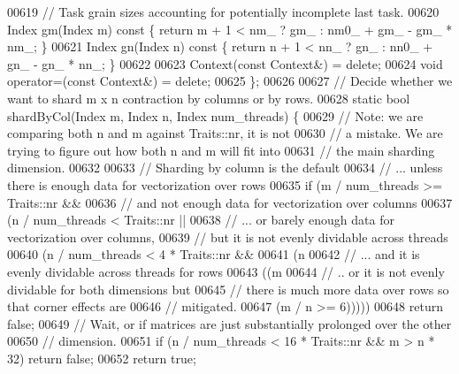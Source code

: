 \begin{DoxyCode}
00619     \textcolor{comment}{// Task grain sizes accounting for potentially incomplete last task.}
00620     Index gm(Index m)\textcolor{keyword}{ const }\{ \textcolor{keywordflow}{return} m + 1 < nm\_ ? gm\_ : nm0\_ + gm\_ - gm\_ * nm\_; \}
00621     Index gn(Index n)\textcolor{keyword}{ const }\{ \textcolor{keywordflow}{return} n + 1 < nn\_ ? gn\_ : nn0\_ + gn\_ - gn\_ * nn\_; \}
00622 
00623     Context(\textcolor{keyword}{const} Context&) = \textcolor{keyword}{delete};
00624     \textcolor{keywordtype}{void} operator=(\textcolor{keyword}{const} Context&) = \textcolor{keyword}{delete};
00625   \};
00626 
00627   \textcolor{comment}{// Decide whether we want to shard m x n contraction by columns or by rows.}
00628   \textcolor{keyword}{static} \textcolor{keywordtype}{bool} shardByCol(Index m, Index n, Index num\_threads) \{
00629     \textcolor{comment}{// Note: we are comparing both n and m against Traits::nr, it is not}
00630     \textcolor{comment}{// a mistake. We are trying to figure out how both n and m will fit into}
00631     \textcolor{comment}{// the main sharding dimension.}
00632 
00633     \textcolor{comment}{// Sharding by column is the default}
00634     \textcolor{comment}{// ... unless there is enough data for vectorization over rows}
00635     \textcolor{keywordflow}{if} (m / num\_threads >= Traits::nr &&
00636         \textcolor{comment}{// and not enough data for vectorization over columns}
00637         (n / num\_threads < Traits::nr ||
00638          \textcolor{comment}{// ... or barely enough data for vectorization over columns,}
00639          \textcolor{comment}{// but it is not evenly dividable across threads}
00640          (n / num\_threads < 4 * Traits::nr &&
00641           (n %
00642           \textcolor{comment}{// ... and it is evenly dividable across threads for rows}
00643           ((m %
00644            \textcolor{comment}{// .. or it is not evenly dividable for both dimensions but}
00645            \textcolor{comment}{// there is much more data over rows so that corner effects are}
00646            \textcolor{comment}{// mitigated.}
00647            (m / n >= 6)))))
00648       \textcolor{keywordflow}{return} \textcolor{keyword}{false};
00649     \textcolor{comment}{// Wait, or if matrices are just substantially prolonged over the other}
00650     \textcolor{comment}{// dimension.}
00651     \textcolor{keywordflow}{if} (n / num\_threads < 16 * Traits::nr && m > n * 32) \textcolor{keywordflow}{return} \textcolor{keyword}{false};
00652     \textcolor{keywordflow}{return} \textcolor{keyword}{true};

\end{DoxyCode}
